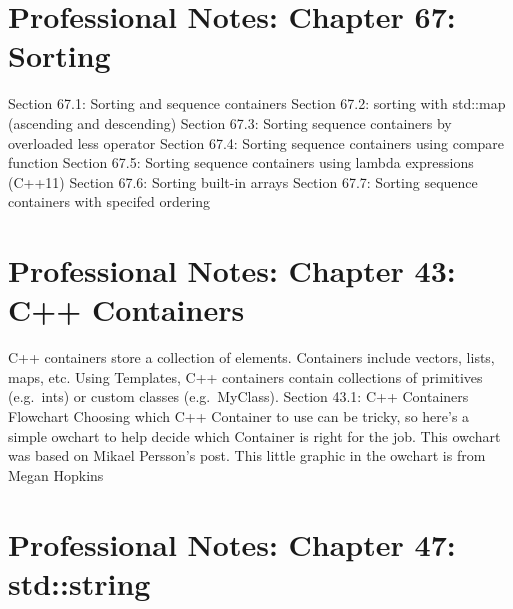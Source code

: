 \hypertarget{professional-notes-chapter-67-sorting}{%
\section{Professional Notes: Chapter 67:
Sorting}\label{professional-notes-chapter-67-sorting}}

Section 67.1: Sorting and sequence containers Section 67.2: sorting with
std::map (ascending and descending) Section 67.3: Sorting sequence
containers by overloaded less operator Section 67.4: Sorting sequence
containers using compare function Section 67.5: Sorting sequence
containers using lambda expressions (C++11) Section 67.6: Sorting
built-in arrays Section 67.7: Sorting sequence containers with specifed
ordering

\hypertarget{professional-notes-chapter-43-c-containers}{%
\section{Professional Notes: Chapter 43: C++
Containers}\label{professional-notes-chapter-43-c-containers}}

C++ containers store a collection of elements. Containers include
vectors, lists, maps, etc. Using Templates, C++ containers contain
collections of primitives (e.g.~ints) or custom classes (e.g.~MyClass).
Section 43.1: C++ Containers Flowchart Choosing which C++ Container to
use can be tricky, so here's a simple owchart to help decide which
Container is right for the job. This owchart was based on Mikael
Persson's post. This little graphic in the owchart is from Megan Hopkins

\hypertarget{professional-notes-chapter-47-stdstring-1}{%
\section{Professional Notes: Chapter 47:
std::string}\label{professional-notes-chapter-47-stdstring-1}}

